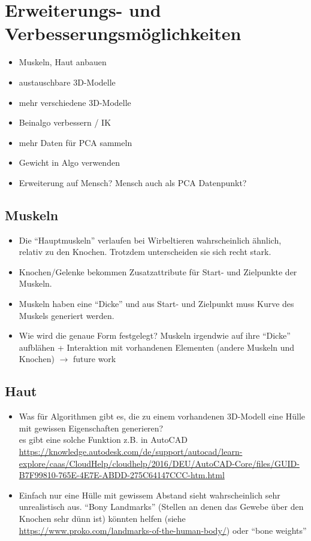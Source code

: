 \chapter{Erweiterungs- und Verbesserungsmöglichkeiten}

\begin{itemize}
 \item Muskeln, Haut \etc anbauen
 \item austauschbare 3D-Modelle
 \item mehr verschiedene 3D-Modelle
 \item Beinalgo verbessern / IK
 \item mehr Daten für PCA sammeln
 \item Gewicht in Algo verwenden
 \item Erweiterung auf Mensch? Mensch auch als PCA Datenpunkt?
\end{itemize}


\section{Muskeln}

\begin{itemize}
 \item Die "`Hauptmuskeln"' verlaufen bei Wirbeltieren wahrscheinlich ähnlich, relativ zu den Knochen. Trotzdem unterscheiden sie sich recht stark.
 \item Knochen/Gelenke bekommen Zusatzattribute für Start- und Zielpunkte der Muskeln.
 \item Muskeln haben eine "`Dicke"' und aus Start- und Zielpunkt muss Kurve des Muskels generiert werden.
 \item Wie wird die genaue Form festgelegt? Muskeln irgendwie auf ihre "`Dicke"' aufblähen + Interaktion mit vorhandenen Elementen (andere Muskeln und Knochen) $\rightarrow$ future work
\end{itemize}

\section{Haut}

\begin{itemize}
 \item Was für Algorithmen gibt es, die zu einem vorhandenen 3D-Modell eine Hülle mit gewissen Eigenschaften generieren? \\
 es gibt eine solche Funktion z.B. in AutoCAD \url{https://knowledge.autodesk.com/de/support/autocad/learn-explore/caas/CloudHelp/cloudhelp/2016/DEU/AutoCAD-Core/files/GUID-B7F99810-765E-4E7E-ABDD-275C64147CCC-htm.html}
 \item Einfach nur eine Hülle mit gewissem Abstand sieht wahrscheinlich sehr unrealistisch aus. "`Bony Landmarks"' (Stellen an denen das Gewebe über den Knochen sehr dünn ist) könnten helfen (siehe \url{https://www.proko.com/landmarks-of-the-human-body/}) oder "`bone weights"'
\end{itemize}
